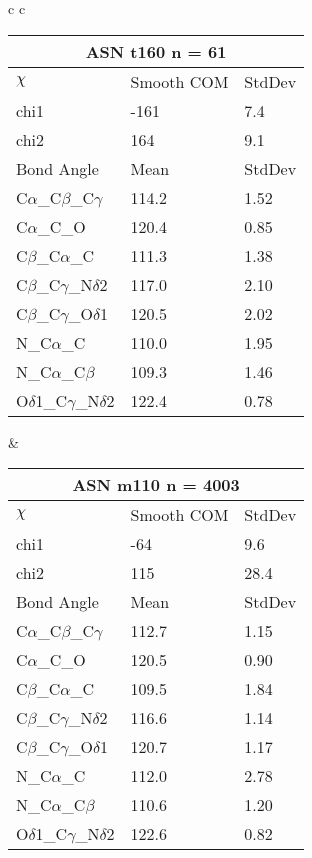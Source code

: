 \begin{longtable}{ c c }
  \\
  \begin{tabular}{ l l l }
  \toprule
  \multicolumn{3}{c}{ASN \textbf{t160} n = 61} \\ \toprule
  $\chi$       & Smooth COM & StdDev \\ \midrule
  chi1 & -161 & 7.4 \\ 
  chi2 & 164 & 9.1 \\ \midrule
  Bond Angle   & Mean     & StdDev \\ \midrule
  C$\alpha$\_C$\beta$\_C$\gamma$ & 114.2 & 1.52\\
  C$\alpha$\_C\_O & 120.4 & 0.85\\
  C$\beta$\_C$\alpha$\_C & 111.3 & 1.38\\
  C$\beta$\_C$\gamma$\_N$\delta$2 & 117.0 & 2.10\\
  C$\beta$\_C$\gamma$\_O$\delta$1 & 120.5 & 2.02\\
  N\_C$\alpha$\_C & 110.0 & 1.95\\
  N\_C$\alpha$\_C$\beta$ & 109.3 & 1.46\\
  O$\delta$1\_C$\gamma$\_N$\delta$2 & 122.4 & 0.78\\
  \bottomrule
  \end{tabular}
  &
  \begin{tabular}{ l l l }
  \toprule
  \multicolumn{3}{c}{ASN \textbf{m110} n = 4003} \\ \toprule
  $\chi$       & Smooth COM & StdDev \\ \midrule
  chi1 & -64 & 9.6 \\ 
  chi2 & 115 & 28.4 \\ \midrule
  Bond Angle   & Mean     & StdDev \\ \midrule
  C$\alpha$\_C$\beta$\_C$\gamma$ & 112.7 & 1.15\\
  C$\alpha$\_C\_O & 120.5 & 0.90\\
  C$\beta$\_C$\alpha$\_C & 109.5 & 1.84\\
  C$\beta$\_C$\gamma$\_N$\delta$2 & 116.6 & 1.14\\
  C$\beta$\_C$\gamma$\_O$\delta$1 & 120.7 & 1.17\\
  N\_C$\alpha$\_C & 112.0 & 2.78\\
  N\_C$\alpha$\_C$\beta$ & 110.6 & 1.20\\
  O$\delta$1\_C$\gamma$\_N$\delta$2 & 122.6 & 0.82\\
  \bottomrule
  \end{tabular}
  \\
  \begin{tabular}{ l l l }

\end{tabular}
\end{longtable}
